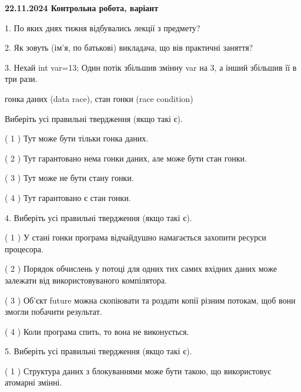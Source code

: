 \documentclass[12pt, ukrainian]{article}
\begin{document}
\vspace{4mm}
\newpage
\begin {large}

\textbf{22.11.2024 Контрольна робота, варіант  }\par


{
1. По яких днях тижня відбувались лекції з предмету?



\vspace{5mm}
2. Як зовуть (ім'я, по батькові) викладача, що вів практичні заняття?



\vspace{5mm}
3. Нехай int var=13; Один потік збільшив змінну var на 3, а інший збільшив її в три рази.

гонка даних (data race), стан гонки (race condition)

Виберіть усі правильні твердження (якщо такі є).\par
\vspace{2mm}
( 1 ) Тут може бути тільки гонка даних.%

( 2 ) Тут гарантовано нема гонки даних, але може бути стан гонки.%

( 3 ) Тут може не бути стану гонки.%

( 4 ) Тут гарантовано є стан гонки.%


\vspace{5mm}
4. Виберіть усі правильні твердження (якщо такі є).\par
\vspace{2mm}

( 1 ) У стані гонки програма відчайдушно намагається захопити ресурси процесора.%

( 2 ) Порядок обчислень у потоці для одних тих самих вхідних даних може залежати від використовуваного компілятора.%

( 3 ) Об’єкт future можна скопіювати та роздати копії різним потокам, щоб вони змогли побачити результат.%

( 4 ) Коли програма спить, то вона не виконується.%


\vspace{5mm}
5. Виберіть усі правильні твердження (якщо такі є).\par
\vspace{2mm}

( 1 ) Структура даних з блокуваннями може бути такою, що використовує атомарні змінні.%

}
\end{large}
\end{document}
